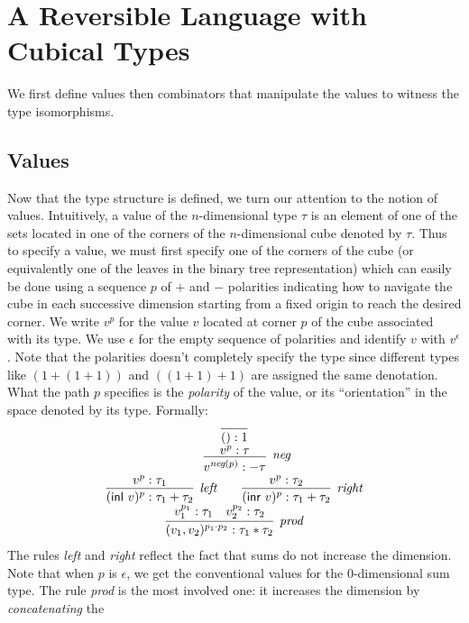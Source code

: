 \documentclass[authoryear,preprint]{sigplanconf}
\newcommand{\negp}[1]{\textit{neg}(#1)}
\newcommand{\inl}[1]{\textsf{inl}~#1}
\newcommand{\inr}[1]{\textsf{inr}~#1}
\begin{document}
\section{A Reversible Language with Cubical Types} 

We first define values then combinators that manipulate the values to witness
the type isomorphisms.

\subsection{Values} 

Now that the type structure is defined, we turn our attention to the notion
of values. Intuitively, a value of the $n$-dimensional type $\tau$ is an
element of one of the sets located in one of the corners of the
$n$-dimensional cube denoted by $\tau$. Thus to specify a value, we must
first specify one of the corners of the cube (or equivalently one of the
leaves in the binary tree representation) which can easily be done using a
sequence $p$ of $+$ and $-$ polarities indicating how to navigate the cube in
each successive dimension starting from a fixed origin to reach the desired
corner. We write $v^{p}$ for the value $v$ located at corner $p$ of the cube
associated with its type. We use $\epsilon$ for the empty sequence of
polarities and identify $v$ with $v^\epsilon$. Note that the polarities
doesn't completely specify the type since different types like $(1+(1+1))$
and $((1+1)+1)$ are assigned the same denotation. What the path $p$ specifies
is the \emph{polarity} of the value, or its ``orientation'' in the space
denoted by its type. Formally:
\[\begin{array}{c}
\infer{() : 1}{} \\
\qquad
\infer[\textit{neg}]{v^{\negp{p}} : - \tau}{v^p : \tau} 
\\
\infer[\textit{left}]{(\inl{v})^{p} : \tau_1 + \tau_2}{v^{p} : \tau_1}
\qquad
\infer[\textit{right}]{(\inr{v})^{p} : \tau_1 + \tau_2}{v^{p} : \tau_2} 
\\
\infer[\textit{prod}]{(v_1,v_2)^{p_1 \cdot p_2} : \tau_1 * \tau_2}
      {v_1^{p_1} : \tau_1 & v_2^{p_2} : \tau_2} 
\end{array}\]
The rules \textit{left} and \textit{right} reflect the fact that sums do not
increase the dimension. Note that when $p$ is $\epsilon$, we get the
conventional values for the 0-dimensional sum type. The rule \textit{prod} is
the most involved one: it increases the dimension by \emph{concatenating} the
\end{document}
